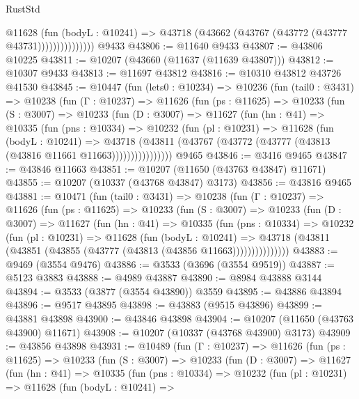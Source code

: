 \begin{lexlean}{RustStd}
\begin{coremodule}
                      @11628
                        (fun (bodyL : @10241) =>
                        @43718 (@43662 (@43767 (@43772 (@43777 @43731)))))))))))))))
    @9433
@43806 := @11640 @9433
@43807 := @43806 @10225
@43811 := @10207 (@43660 (@11637 (@11639 @43807)))
@43812 := @10307 @9433
@43813 := @11697 @43812
@43816 := @10310 @43812 @43726 @41530
@43845 := @10447
    (fun (lets0 : @10234) =>
    @10236
      (fun (tail0 : @3431) =>
      @10238
        (fun (Γ : @10237) =>
        @11626
          (fun (ps : @11625) =>
          @10233
            (fun (S : @3007) =>
            @10233
              (fun (D : @3007) =>
              @11627
                (fun (hn : @41) =>
                @10335
                  (fun (pns : @10334) =>
                  @10232
                    (fun (pl : @10231) =>
                    @11628
                      (fun (bodyL : @10241) =>
                      @43718
                        (@43811
                          (@43767 (@43772 (@43777 (@43813 (@43816 @11661 @11663))))))))))))))))
    @9465
@43846 := @3416 @9465
@43847 := @43846 @11663
@43851 := @10207 (@11650 (@43763 @43847) @11671)
@43855 := @10207 (@10337 (@43768 @43847) @3173)
@43856 := @43816 @9465
@43881 := @10471
    (fun (tail0 : @3431) =>
    @10238
      (fun (Γ : @10237) =>
      @11626
        (fun (ps : @11625) =>
        @10233
          (fun (S : @3007) =>
          @10233
            (fun (D : @3007) =>
            @11627
              (fun (hn : @41) =>
              @10335
                (fun (pns : @10334) =>
                @10232
                  (fun (pl : @10231) =>
                  @11628
                    (fun (bodyL : @10241) =>
                    @43718 (@43811 (@43851 (@43855 (@43777 (@43813 (@43856 @11663)))))))))))))))
@43883 := @9469 (@3554 @9476)
@43886 := @3533 (@3696 (@3554 @9519))
@43887 := @5123 @3883
@43888 := @4989 @43887
@43890 := @8984 @43888 @3144
@43894 := @3533 (@3877 (@3554 @43890)) @3559
@43895 := @43886 @43894
@43896 := @9517 @43895
@43898 := @43883 (@9515 @43896)
@43899 := @43881 @43898
@43900 := @43846 @43898
@43904 := @10207 (@11650 (@43763 @43900) @11671)
@43908 := @10207 (@10337 (@43768 @43900) @3173)
@43909 := @43856 @43898
@43931 := @10489
    (fun (Γ : @10237) =>
    @11626
      (fun (ps : @11625) =>
      @10233
        (fun (S : @3007) =>
        @10233
          (fun (D : @3007) =>
          @11627
            (fun (hn : @41) =>
            @10335
              (fun (pns : @10334) =>
              @10232
                (fun (pl : @10231) =>
                @11628
                  (fun (bodyL : @10241) =>

\end{coremodule}
\end{lexlean}
